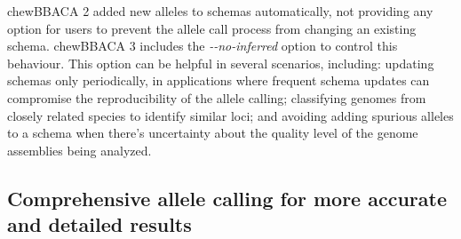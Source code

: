 chewBBACA 2 added new alleles to schemas automatically, not providing any option for users to prevent the allele call process from changing an existing schema. chewBBACA 3 includes the \textit{-{}-no-inferred} option to control this behaviour. This option can be helpful in several scenarios, including: updating schemas only periodically, in applications where frequent schema updates can compromise the reproducibility of the allele calling; classifying genomes from closely related species to identify similar loci; and avoiding adding spurious alleles to a schema when there's uncertainty about the quality level of the genome assemblies being analyzed.

\subsection{Comprehensive allele calling for more accurate and detailed results} \label{ssec:ch2_results_discussion_ssec3}

